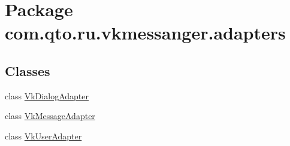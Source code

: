\hypertarget{namespacecom_1_1qto_1_1ru_1_1vkmessanger_1_1adapters}{}\section{Package com.\+qto.\+ru.\+vkmessanger.\+adapters}
\label{namespacecom_1_1qto_1_1ru_1_1vkmessanger_1_1adapters}
\subsection*{Classes}
\begin{DoxyCompactItemize}
\item 
class \hyperlink{classcom_1_1qto_1_1ru_1_1vkmessanger_1_1adapters_1_1_vk_dialog_adapter}{Vk\+Dialog\+Adapter}
\item 
class \hyperlink{classcom_1_1qto_1_1ru_1_1vkmessanger_1_1adapters_1_1_vk_message_adapter}{Vk\+Message\+Adapter}
\item 
class \hyperlink{classcom_1_1qto_1_1ru_1_1vkmessanger_1_1adapters_1_1_vk_user_adapter}{Vk\+User\+Adapter}
\end{DoxyCompactItemize}
